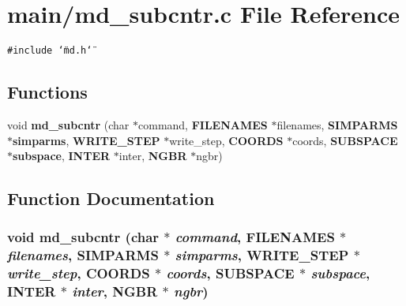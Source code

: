 \section{main/md\_\-subcntr.c File Reference}
\label{md__subcntr_8c}
{\tt \#include \char`\"{}md.h\char`\"{}}\par
\subsection*{Functions}
\begin{CompactItemize}
\item 
void {\bf md\_\-subcntr} (char $\ast$command, {\bf FILENAMES} $\ast$filenames, {\bf SIMPARMS} $\ast${\bf simparms}, {\bf WRITE\_\-STEP} $\ast$write\_\-step, {\bf COORDS} $\ast$coords, {\bf SUBSPACE} $\ast${\bf subspace}, {\bf INTER} $\ast$inter, {\bf NGBR} $\ast$ngbr)
\end{CompactItemize}


\subsection{Function Documentation}
\subsubsection{\setlength{\rightskip}{0pt plus 5cm}void md\_\-subcntr (char $\ast$ {\em command}, {\bf FILENAMES} $\ast$ {\em filenames}, {\bf SIMPARMS} $\ast$ {\em simparms}, {\bf WRITE\_\-STEP} $\ast$ {\em write\_\-step}, {\bf COORDS} $\ast$ {\em coords}, {\bf SUBSPACE} $\ast$ {\em subspace}, {\bf INTER} $\ast$ {\em inter}, {\bf NGBR} $\ast$ {\em ngbr})}\label{md__subcntr_8c_e356bcd48d646d22a7acda7833aae309}


